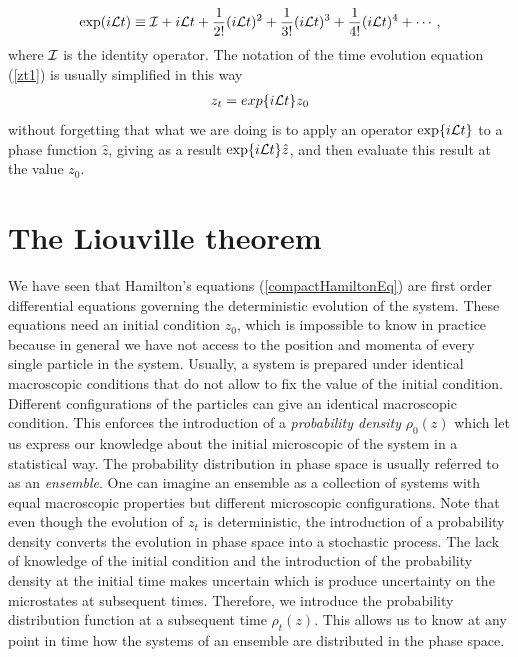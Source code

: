 \documentclass[b5paper,openright,10pt]{book}
\begin{document}
\begin{align}
  {\rm exp}(i{\cal L}t) \equiv {\cal I} + i{\cal L}t + \frac{1}{2!}(i{\cal L}t)^2 + \frac{1}{3!}(i{\cal L}t)^3 +  \frac{1}{4!}(i{\cal L}t)^4 + \cdots,
\end{align}
where ${\cal I}$ is the identity operator.
The notation of the time evolution equation (\ref{zt1}) is usually simplified in this way 
\begin{align}
  z_t = exp\{i{\cal L}t\}z_0
  \label{zt}
\end{align}
without forgetting that what we are doing is to apply an operator ${\rm exp}\{i{\cal L}t\}$ to a phase function $\hat{z}$, giving as a result ${\rm exp}\{i{\cal L}t\}\hat{z}$, and then evaluate this result at the value $z_0$.


\section{The Liouville theorem}
We have seen that Hamilton's equations (\ref{compactHamiltonEq}) are first order differential equations governing the deterministic evolution of the system. 
These equations need an initial condition $z_0$, which is impossible to know in practice because in general we have not access to the position and momenta of every single particle in the system. Usually, a system is prepared under identical macroscopic conditions that do not allow to fix the value of the initial condition. 
Different configurations of the particles can give an identical macroscopic condition. 
This enforces the introduction of a {\it probability density} $\rho_0(z)$ which let us express our knowledge about the initial microscopic of the system in a statistical way. The probability distribution in phase space is usually referred to as an {\it ensemble}. One can imagine an ensemble as a collection of systems with equal macroscopic properties but different microscopic configurations.
Note that even though the evolution of $z_t$ is deterministic, the introduction of a probability density converts the evolution in phase space into a stochastic process.
The lack of knowledge of the initial condition and the introduction of the probability density at the initial time makes uncertain which is produce uncertainty on the microstates at subsequent times. Therefore, we introduce the probability distribution function at a subsequent time $\rho_t(z)$.
This allows us to know at any point in time how the systems of an ensemble are distributed in the phase space.
\end{document}
